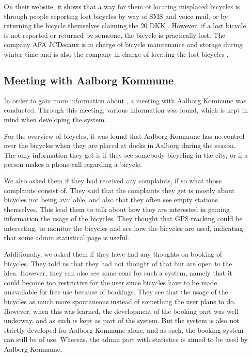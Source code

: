 On their website, it shows that a way for them of locating misplaced bicycles is through people reporting lost bicycles by way of SMS and voice mail, or by returning the bicycle themselves claiming the 20 DKK \citep{misc:aalborgbycykelmangler}.
However, if a lost bicycle is not reported or returned by someone, the bicycle is practically lost.
The company AFA JCDecaux is in charge of bicycle maintenance and storage during winter time and is also the company in charge of locating the lost bicycles \citep{misc:aalborgcykling}.

\subsection{Meeting with Aalborg Kommune}\label{subsec:meetingaalborg}
In order to gain more information about \bycykelwithoutspace, a meeting with Aalborg Kommune was conducted. 
Through this meeting, various information was found, which is kept in mind when developing the system.

For the overview of bicycles, it was found that Aalborg Kommune has no control over the bicycles when they are placed at docks in Aalborg during the season.
The only information they get is if they see somebody bicycling in the city, or if a person makes a phone-call regarding a bicycle.

We also asked them if they had received any complaints, if so what those complaints consist of.
They said that the complaints they get is mostly about bicycles not being available, and also that they often see empty stations themselves.
This lead them to talk about how they are interested in gaining information the usage of the bicycles.
They thought that GPS tracking could be interesting, to monitor the bicycles and see how the bicycles are used, indicating that some admin statistical page is useful.

Additionally, we asked them if they have had any thoughts on booking of bicycles.
They told us that they had not thought of that but are open to the idea.
However, they can also see some cons for such a system, namely that it could become too restrictive for the user since bicycles have to be made unavailable for free use because of bookings.
They see that the usage of the bicycles as much more spontaneous instead of something the user plans to do.
However, when this was learned, the development of the booking part was well underway, and as such is kept as part of the system.
But the system is also not strictly developed for Aalborg Kommune alone, and as such, the booking system can still be of use.
Whereas, the admin part with statistics is aimed to be used by Aalborg Kommune.

